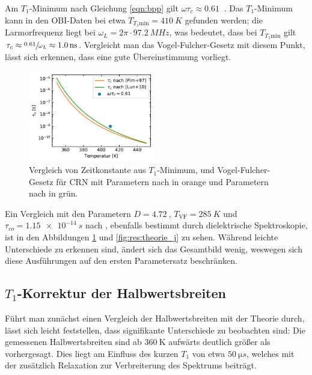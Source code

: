 Am $T_1$-Minimum nach Gleichung \eqref{eqn:bpp} gilt $\omega \tau_c \approx \SI{0.61}{}$ \cite[S. 629]{omegatau061}. Das $T_1$-Minimum kann in den OBI-Daten bei etwa $T_{T_1 \text{min}} = \SI{410}{K}$ gefunden werden; die Larmorfrequenz liegt bei $\omega_L = 2\pi \cdot \SI{97.2}{MHz}$, was bedeutet, dass bei $T_{T_1 \text{min}}$ gilt $\tau_c \approx \sfrac{\SI{0.61}{}}{\omega_L} \approx \SI{1.0}{\nano s}$. Vergleicht man das Vogel-Fulcher-Gesetz mit diesem Punkt, lässt sich erkennen, dass eine gute Übereinstimmung vorliegt.

\begin{figure}
	\vspace{-20pt}
	\begin{center}
		\includegraphics[width=0.49\textwidth]{graphics/plot/vftau.pdf}
	\end{center}
	\vspace{-20pt}
	\caption{Vergleich von Zeitkonstante aus $T_1$-Minimum, und Vogel-Fulcher-Gesetz für CRN mit Parametern nach \cite{PIMENOV199793} in orange und Parametern nach \cite{crn_augsburg} in grün. \label{fig:korrelationszeiten}}
\end{figure}
Ein Vergleich mit den Parametern $D = \SI{4.72}{}$, $T_\text{VF} = \SI{285}{K}$ und $\tau_{co} = \SI{1.15e-14}{s}$ nach \cite{crn_augsburg}, ebenfalls bestimmt durch dielektrische Spektroskopie, ist in den Abbildungen \ref{fig:korrelationszeiten} und \ref{fig:res:theorie_j} zu sehen. Während leichte Unterschiede zu erkennen sind, ändert sich das Gesamtbild wenig, weswegen sich diese Ausführungen auf den ersten Parametersatz beschränken.


\subsection{$T_1$-Korrektur der Halbwertsbreiten} \label{sub:res:t1korr}

Führt man zunächst einen Vergleich der Halbwertsbreiten mit der Theorie durch, lässt sich leicht feststellen, dass signifikante Unterschiede zu beobachten sind: Die gemessenen Halbwertsbreiten sind ab $\SI{360}{\kelvin}$ aufwärts deutlich größer als vorhergesagt. Dies liegt am Einfluss des kurzen $T_1$ von etwa $\SI{50}{\micro s}$, welches mit der zusätzlich Relaxation zur Verbreiterung des Spektrums beiträgt.

